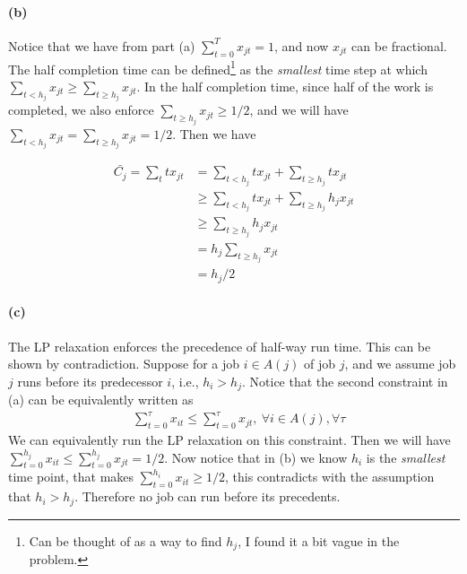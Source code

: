 \documentclass[12pt]{article}
\begin{document}
\paragraph{(b)} Notice that we have from part (a) $\sum_{t=0}^T x_{jt} = 1$, and now $x_{jt}$ can be fractional. The half completion time can be defined\footnote{Can be thought of as a way to find $h_j$, I found it a bit vague in the problem.} as the \emph{smallest} time step at which $\sum_{t < h_j} x_{jt} \geq \sum_{t \geq h_j} x_{jt}$. In the half completion time, since half of the work is completed, we also enforce $\sum_{t\geq h_j} x_{jt} \geq 1/2$, and we will have $\sum_{t < h_j} x_{jt} = \sum_{t \geq h_j} x_{jt} = 1/2$. Then we have 

\begin{align*}
\bar{C_j} = \sum_t t x_{jt} &= \sum_{t< h_j} t x_{jt} + \sum_{t\geq h_j} t x_{jt}\\
& \geq \sum_{t< h_j} t x_{jt} + \sum_{t\geq h_j} h_j x_{jt}\\
&\geq \sum_{t\geq h_j} h_j x_{jt}\\
&= h_j\sum_{t\geq h_j} x_{jt}\\
&= h_j/2
\end{align*}

\paragraph{(c)} The LP relaxation enforces the precedence of half-way run time. This can be shown by contradiction. Suppose for a job $i \in A(j)$ of job $j$, and we assume job $j$ runs before its predecessor $i$, i.e., $h_i > h_j$. Notice that the second constraint in (a) can be equivalently written as 
\begin{align*}
&\sum_{t=0}^\tau x_{it} \leq \sum_{t=0}^\tau x_{jt}, \: \forall i \in A(j) , \forall \tau
\end{align*}
We can equivalently run the LP relaxation on this constraint. Then we will have $\sum_{t=0}^{h_j} x_{it} \leq \sum_{t=0}^{h_j} x_{jt} = 1/2$. Now notice that in (b) we know $h_i$ is the \emph{smallest} time point, that makes $\sum_{t=0}^{h_i} x_{it} \geq 1/2$, this contradicts with the assumption that $h_i > h_j$. Therefore no job can run before its precedents.
\end{document}
